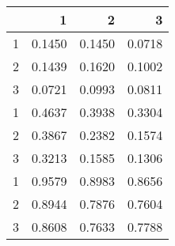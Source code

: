 \begin{tabular}{lrrr}
\toprule
{} &       1 &       2 &       3 \\
\midrule
1 &  0.1450 &  0.1450 &  0.0718 \\
2 &  0.1439 &  0.1620 &  0.1002 \\
3 &  0.0721 &  0.0993 &  0.0811 \\
1 &  0.4637 &  0.3938 &  0.3304 \\
2 &  0.3867 &  0.2382 &  0.1574 \\
3 &  0.3213 &  0.1585 &  0.1306 \\
1 &  0.9579 &  0.8983 &  0.8656 \\
2 &  0.8944 &  0.7876 &  0.7604 \\
3 &  0.8608 &  0.7633 &  0.7788 \\
\bottomrule
\end{tabular}
